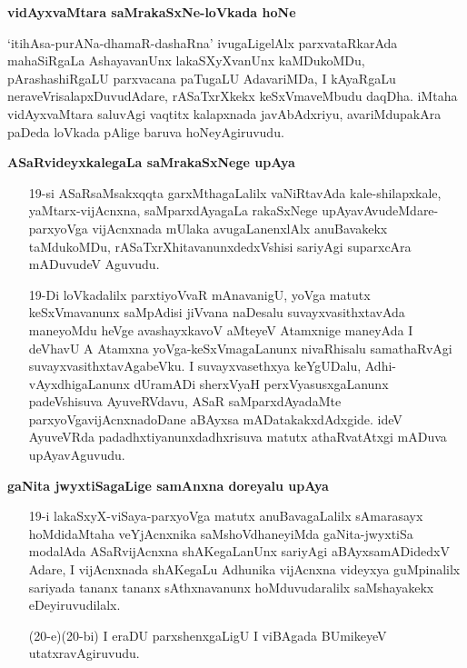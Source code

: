 \textbf{vidAyxvaMtara saMrakaSxNe-loVkada hoNe}

`itihAsa-purANa-dhamaR-dashaRna' ivugaLigelAlx parxvataRkarAda mahaSiRgaLa AshayavanUnx lakaSXyXvanUnx kaMDukoMDu, pArashashiRgaLU parxvacana paTugaLU AdavariMDa, I kAyaRgaLu neraveVrisalapxDuvudAdare, rASaTxrXkekx keSxVmaveMbudu daqDha. iMtaha vidAyxvaMtara saluvAgi vaqtitx kalapxnada javAbAdxriyu, avariMdupakAra paDeda loVkada pAlige baruva hoNeyAgiruvudu.

\textbf{ASaRvideyxkalegaLa saMrakaSxNege upAya}

\begin{itemize}
\item[19-si] ASaRsaMsakxqqta garxMthagaLalilx vaNiRtavAda kale-shilapxkale, yaMtarx-vijAcnxna, saMparxdAyagaLa rakaSxNege upAyavAvudeMdare-parxyoVga vijAcnxnada mUlaka avugaLanenxlAlx anuBavakekx taMdukoMDu, rASaTxrXhitavanunxdedxVshisi sariyAgi suparxcAra mADuvudeV Aguvudu.
\end{itemize}

\begin{itemize}
\item[19-Di] loVkadalilx parxtiyoVvaR mAnavanigU, yoVga matutx keSxVmavanunx saMpAdisi jiVvana naDesalu suvayxvasithxtavAda maneyoMdu heVge avashayxkavoV aMteyeV Atamxnige maneyAda I deVhavU A Atamxna yoVga-keSxVmagaLanunx nivaRhisalu samathaRvAgi suvayxvasithxtavAgabeVku. I suvayxvasethxya keYgUDalu, Adhi-vAyxdhigaLanunx dUramADi sherxVyaH perxVyasusxgaLanunx padeVshisuva AyuveRVdavu, ASaR saMparxdAyadaMte parxyoVgavijAcnxnadoDane aBAyxsa mADatakakxdAdxgide. ideV AyuveVRda padadhxtiyanunxdadhxrisuva matutx athaRvatAtxgi mADuva upAyavAguvudu.
\end{itemize}

\textbf{gaNita jwyxtiSagaLige samAnxna doreyalu upAya}

\begin{itemize}
\item[19-i] lakaSxyX-viSaya-parxyoVga matutx anuBavagaLalilx sAmarasayx hoMdidaMtaha veYjAcnxnika saMshoVdhaneyiMda gaNita-jwyxtiSa modalAda ASaRvijAcnxna shAKegaLanUnx sariyAgi aBAyxsamADidedxV Adare, I vijAcnxnada shAKegaLu Adhunika vijAcnxna videyxya guMpinalilx sariyada tananx tananx sAthxnavanunx hoMduvudaralilx saMshayakekx eDeyiruvudilalx.
\end{itemize}

\begin{itemize}
\item[(20-e)(20-bi)] I eraDU parxshenxgaLigU I viBAgada BUmikeyeV utatxravAgiruvudu.
\end{itemize}

